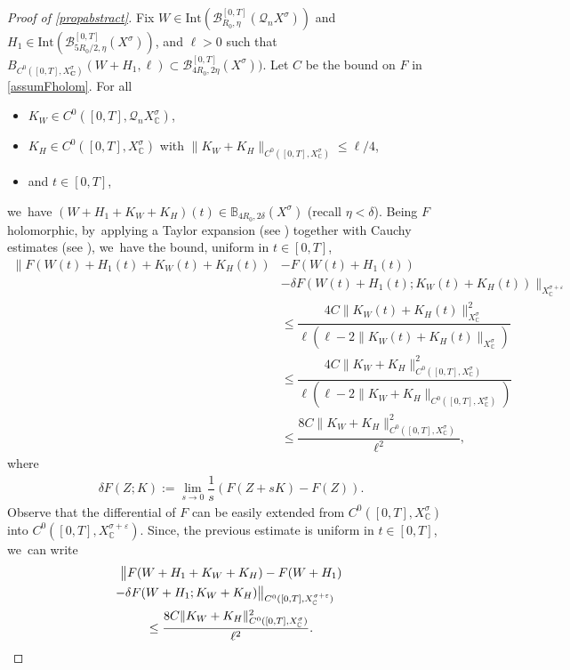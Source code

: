 \documentclass[11pt]{article}
\theoremstyle{definition}
\let\mc\mathcal
\let\veps\varepsilon
\newcommand{\B}{\mc{B}}
\newcommand{\C}{\boldsymbol{C}}
\newcommand{\Q}{\mathcal{Q}}
\providecommand{\norm}[1]{\lVert#1\rVert}
\begin{document}
\begin{proof}[Proof of \cref{propabstract}]
Fix $W\in \text{Int}(\B_{R_0, \eta}^{[0, T]}(\Q_nX^\sigma))$ and $H_1\in \text{Int}(\B_{5R_0/2, \eta}^{[0, T]}(X^\sigma))$, and $\ell>0$ such that $B_{C^0([0,T],X_{\C}^\sigma)}(W+H_1,\ell)\subset \B_{4R_0, 2\eta}^{[0, T]}(X^\sigma))$. Let $C$ be the bound on $F$ in \cref{assumFholom}. For all
\begin{itemize}
\item
$K_W\in C^0([0, T], \Q_n X_\mathbb{C}^\sigma)$,
\item
$K_H\in C^0([0, T], X_\mathbb{C}^\sigma)$ with $\norm{K_W+K_H}_{C^0([0, T], X_\mathbb{C}^\sigma)}\leq \ell/4$,
\item
and $t\in [0,T]$,
\end{itemize}
we~have $(W+H_1+K_W+K_H)(t) \in \mathbb{B}_{4R_{0},2\delta}(X^{\sigma})$ (recall $\eta<\delta$). Being $F$ holomorphic, by~applying a Taylor expansion (see \cite[Th.\,7.1, Cor.\,7.3]{Muj86}) together with Cauchy estimates (see \cite[Cor.\,7.4]{Muj86}), we~have the bound, uniform in $t\in [0,T]$,
\begin{align*}
\lVert F(W(t)+H_1(t)+K_W(t)+K_H(t))&-F(W(t)+H_1(t))\\
&-\delta F(W(t)+H_1(t); K_W(t)+K_H(t)) \rVert_{ X_\mathbb{C}^{\sigma+\veps}}\\
&\leq \dfrac{4C\norm{K_W(t)+K_H(t)}_{X_\mathbb{C}^\sigma}^2}{\ell(\ell-2\norm{K_W(t)+K_H(t)}_{X_\mathbb{C}^\sigma})} \\
&\leq \dfrac{4C\norm{K_W+K_H}_{C^0([0, T], X_\mathbb{C}^\sigma)}^2}{\ell(\ell-2\norm{K_W+K_H}_{C^0([0, T], X_\mathbb{C}^\sigma)})}\\
&\leq \dfrac{8C\norm{K_W+K_H}_{C^0([0, T], X_\mathbb{C}^\sigma)}^2}{\ell^2},
\end{align*}
where
\begin{align*}
\delta F(Z; K):=\lim_{s\to 0}\dfrac{1}{s}(F(Z+sK)-F(Z)).
\end{align*}
Observe that the differential of $F$ can be easily extended from $C^0([0, T], X_\mathbb{C}^\sigma)$ into $C^0([0, T], X_\mathbb{C}^{\sigma+\veps})$. Since, the previous estimate is uniform in $t\in [0,T]$, we~can write
\begin{multline}
\bigl\Vert F(W+H_1+K_W+K_H)-F(W+H_1)\\
\shoveright{-\delta F(W+H_1; K_W+K_H)\bigr\Vert_{C^0([0, T], X_\mathbb{C}^{\sigma+\veps})}}\\
\leq \dfrac{8C\norm{K_W+K_H}_{C^0([0, T], X_\mathbb{C}^\sigma)}^2}{\ell^2}.\label{prop:proof:frechet-1}
\end{multline}


\end{proof}
\end{document}
